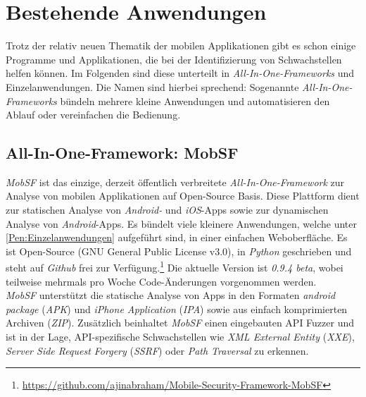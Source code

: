 \section{Bestehende Anwendungen}
Trotz der relativ neuen Thematik der mobilen Applikationen gibt es schon einige Programme und Applikationen, die bei der Identifizierung von Schwachstellen helfen können. Im Folgenden sind diese unterteilt in \textit{All-In-One-Frameworks} und Einzelanwendungen. Die Namen sind hierbei sprechend: Sogenannte \textit{All-In-One-Frameworks} bündeln mehrere kleine Anwendungen und automatisieren den Ablauf oder vereinfachen die Bedienung.

\subsection{All-In-One-Framework: MobSF}
\textit{MobSF} ist das einzige, derzeit öffentlich verbreitete \textit{All-In-One-Framework} zur Analyse von mobilen Applikationen auf Open-Source Basis. Diese Plattform dient zur statischen Analyse von \textit{Android-} und \textit{iOS}-Apps sowie zur dynamischen Analyse von \textit{Android}-Apps. Es bündelt viele kleinere Anwendungen, welche unter \ref{Pen:Einzelanwendungen} aufgeführt sind, in einer einfachen Weboberfläche. Es ist Open-Source (GNU General Public License v3.0), in \textit{Python} geschrieben und steht auf \textit{Github} frei zur Verfügung.\footnote{\url{https://github.com/ajinabraham/Mobile-Security-Framework-MobSF}} Die aktuelle Version ist \textit{0.9.4 beta}, wobei teilweise mehrmals pro Woche Code-Änderungen vorgenommen werden.\\

\textit{MobSF} unterstützt die statische Analyse von Apps in den Formaten \textit{android package} (\textit{APK}) und \textit{iPhone Application} (\textit{IPA}) sowie aus einfach komprimierten Archiven (\textit{ZIP}). Zusätzlich beinhaltet \textit{MobSF} einen eingebauten API Fuzzer und ist in der Lage, API-spezifische Schwachstellen wie \textit{XML External Entity} (\textit{XXE}), \textit{Server Side Request Forgery} (\textit{SSRF}) oder \textit{Path Traversal} zu erkennen.

